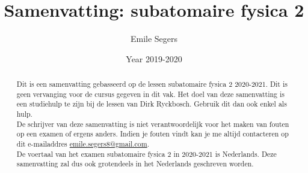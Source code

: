 \documentclass{article}
\title{Samenvatting: subatomaire fysica 2}
\author{Emile Segers}
\date{Year 2019-2020}
\begin{document}
\maketitle

\begin{abstract}
    Dit is een samenvatting gebasseerd op de lessen subatomaire fysica 2 2020-2021. Dit is geen vervanging voor de cursus gegeven in dit vak. Het doel van deze samenvatting is een studiehulp te zijn bij de lessen van Dirk Ryckbosch. Gebruik dit dan ook enkel als hulp.\\
    De schrijver van deze samenvatting is niet verantwoordelijk voor het maken van fouten op een examen of ergens anders. Indien je fouten vindt kan je me altijd contacteren op dit e-mailaddres \href{mailto:emile.segers8@gmail.com}{emile.segers8@gmail.com}.\\
    De voertaal van het examen subatomaire fysica 2 in 2020-2021 is Nederlands. Deze samenvatting zal dus ook grotendeels in het Nederlands geschreven worden.
\end{abstract}

\tableofcontents










\end{document}
